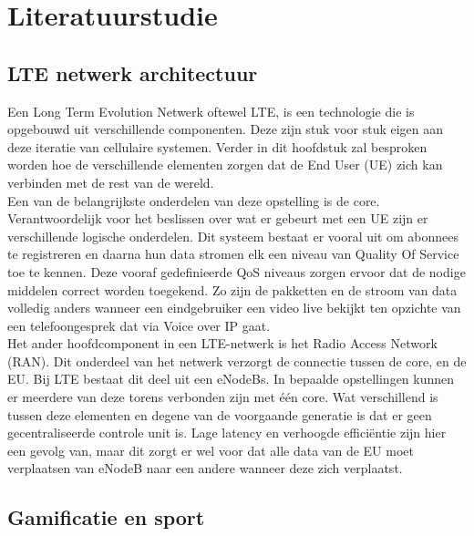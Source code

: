 
\section{Literatuurstudie}%
\label{sec:state-of-the-art}

\subsection{LTE netwerk architectuur}

Een Long Term Evolution Netwerk oftewel LTE, is een technologie die is opgebouwd uit verschillende componenten. Deze zijn stuk voor stuk eigen aan deze iteratie van cellulaire systemen. Verder in dit hoofdstuk zal besproken worden hoe de verschillende elementen zorgen dat de End User (UE) zich kan verbinden met de rest van de wereld.\\

Een van de belangrijkste onderdelen van deze opstelling is de core. Verantwoordelijk voor het beslissen over wat er gebeurt met een UE zijn er verschillende logische onderdelen. Dit systeem bestaat er vooral uit om abonnees te registreren en daarna hun data stromen elk een niveau van Quality Of Service toe te kennen. Deze vooraf gedefinieerde QoS niveaus zorgen ervoor dat de nodige middelen correct worden toegekend. Zo zijn de pakketten en de stroom van data volledig anders wanneer een eindgebruiker een video live bekijkt ten opzichte van een telefoongesprek dat via Voice over IP gaat. \autocite{Palat2011} \\

Het ander hoofdcomponent in een LTE-netwerk is het Radio Access Network (RAN). Dit onderdeel van het netwerk verzorgt de connectie tussen de core, en de EU. Bij LTE bestaat dit deel uit een eNodeBs. In bepaalde opstellingen kunnen er meerdere van deze torens verbonden zijn met één core. Wat verschillend is tussen deze elementen en degene van de voorgaande generatie is dat er geen gecentraliseerde controle unit is. Lage latency en verhoogde efficiëntie zijn hier een gevolg van, maar dit zorgt er wel voor dat alle data van de EU moet verplaatsen van eNodeB naar een andere wanneer deze zich verplaatst. \autocite{Palat2011} \\

\subsection{Gamificatie en sport}

